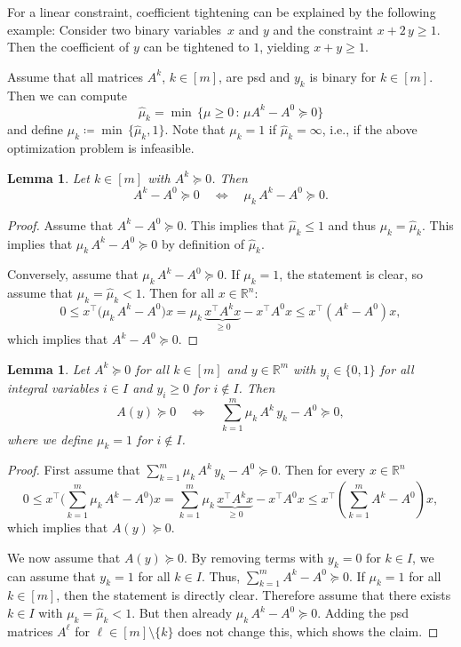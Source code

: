 \documentclass[10pt, a4paper]{article}
\newcommand{\suchthat}{\,:\,}
\newcommand{\define}{\coloneqq}
\newcommand{\T}{^{\top}}
\newcommand{\R}{\mathds{R}}
\newtheorem{lemma}[theorem]{Lemma}
\begin{document}
For a linear constraint, coefficient tightening can be explained by the
following example: Consider two binary variables~$x$ and $y$ and the
constraint $x + 2\, y \geq 1$. Then the coefficient of $y$ can be tightened
to $1$, yielding $x + y \geq 1$.

Assume that all matrices $A^k$, $k \in [m]$, are psd and $y_k$ is binary
for $k \in [m]$. Then we can compute
\begin{equation}\label{eq:ComputeHatMu}
  \hat{\mu}_k = \min\, \{ \mu \geq 0 \suchthat \mu A^k - A^0 \succeq 0\}
\end{equation}
and define $\mu_k \define \min\, \{\hat{\mu}_k, 1\}$. Note that $\mu_k = 1$ if
$\hat{\mu}_k = \infty$, i.e., if the above optimization problem is infeasible.

\begin{lemma}\label{lem:Tightening1}
  Let $k \in [m]$ with $A^k \succeq 0$. Then
  \[
    A^k - A^0 \succeq 0
    \quad\Leftrightarrow\quad
    \mu_k\, A^k - A^0 \succeq 0.
  \]
\end{lemma}

\begin{proof}
  Assume that $A^k - A^0 \succeq 0$. This implies that $\hat{\mu}_k \leq 1$
  and thus $\mu_k = \hat{\mu}_k$. This implies that
  $\mu_k\, A^k - A^0 \succeq 0$ by definition of $\hat{\mu}_k$.

  Conversely, assume that $\mu_k\, A^k - A^0 \succeq 0$. If $\mu_k = 1$, the
  statement is clear, so assume that $\mu_k = \hat{\mu}_k < 1$. Then for
  all $x \in \R^n$:
  \[
    0 \leq x\T \big(\mu_k\, A^k - A^0\big) x = \mu_k\,
    \underbrace{x\T A^k x}_{\geq 0} -
    x\T A^0 x \leq x\T (A^k - A^0) x,
  \]
  which implies that $A^k - A^0 \succeq 0$.
\end{proof}

\begin{lemma}\label{lem:TightenedProblem}
  Let $A^k \succeq 0$ for all $k \in [m]$ and $y \in \R^m$ with
  $y_i \in \{0,1\}$ for all integral variables $i \in I$ and $y_i \geq 0$
  for $i \notin I$. Then
  \[
    A(y) \succeq 0 \quad\Leftrightarrow\quad
    \sum_{k=1}^m \mu_k\, A^k\, y_k - A^0 \succeq 0,
  \]
  where we define $\mu_k = 1$ for $i \notin I$.
\end{lemma}

\begin{proof}
  First assume that
  $\sum_{k=1}^m \mu_k\, A^k\, y_k - A^0 \succeq 0$. Then for every
  $x \in \R^n$
  \[
    0 \leq x\T \bigg(\sum_{k=1}^m \mu_k\, A^k - A^0\bigg) x =
    \sum_{k=1}^m \mu_k\, \underbrace{x\T A^k x}_{\geq 0} -
    x\T A^0 x \leq x\T (\sum_{k=1}^m A^k - A^0) x,
  \]
  which implies that $A(y) \succeq 0$.

  We now assume that $A(y) \succeq 0$. By removing terms with $y_k = 0$ for
  $k \in I$, we can assume that $y_k = 1 $ for all $k \in I$. Thus,
  $\sum_{k=1}^m A^k - A^0 \succeq 0$. If $\mu_k = 1$ for all $k \in [m]$,
  then the statement is directly clear. Therefore assume that there exists
  $k \in I$ with $\mu_k = \hat{\mu}_k < 1$. But then already
  $\mu_k\, A^k - A^0 \succeq 0$. Adding the psd matrices $A^{\ell}$ for
  $\ell \in [m] \setminus \{k\}$ does not change this, which shows the
  claim.
\end{proof}
\end{document}
